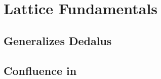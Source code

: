 \section{Lattice Fundamentals}

\subsection{\baselang Generalizes Dedalus}

\subsection{Confluence in \baselang}
